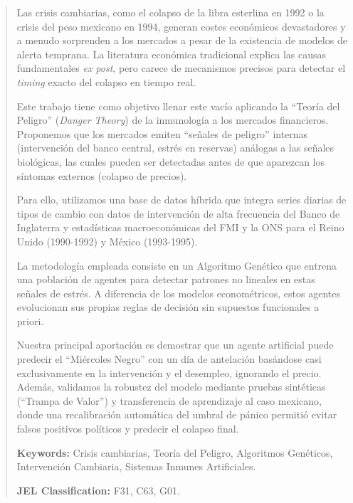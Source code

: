 \begin{abstract}
\noindent
\newline
Las crisis cambiarias, como el colapso de la libra esterlina en 1992 o la crisis del peso mexicano en 1994, generan costes económicos devastadores y a menudo sorprenden a los mercados a pesar de la existencia de modelos de alerta temprana. La literatura económica tradicional explica las causas fundamentales \textit{ex post}, pero carece de mecanismos precisos para detectar el \textit{timing} exacto del colapso en tiempo real.

Este trabajo tiene como objetivo llenar este vacío aplicando la ``Teoría del Peligro'' (\textit{Danger Theory}) de la inmunología a los mercados financieros. Proponemos que los mercados emiten ``señales de peligro'' internas (intervención del banco central, estrés en reservas) análogas a las señales biológicas, las cuales pueden ser detectadas antes de que aparezcan los síntomas externos (colapso de precios).

Para ello, utilizamos una base de datos híbrida que integra series diarias de tipos de cambio con datos de intervención de alta frecuencia del Banco de Inglaterra y estadísticas macroeconómicas del FMI y la ONS para el Reino Unido (1990-1992) y México (1993-1995).

La metodología empleada consiste en un Algoritmo Genético que entrena una población de agentes para detectar patrones no lineales en estas señales de estrés. A diferencia de los modelos econométricos, estos agentes evolucionan sus propias reglas de decisión sin supuestos funcionales a priori.

Nuestra principal aportación es demostrar que un agente artificial puede predecir el ``Miércoles Negro'' con un día de antelación basándose casi exclusivamente en la intervención y el desempleo, ignorando el precio. Además, validamos la robustez del modelo mediante pruebas sintéticas (``Trampa de Valor'') y transferencia de aprendizaje al caso mexicano, donde una recalibración automática del umbral de pánico permitió evitar falsos positivos políticos y predecir el colapso final.

\vspace{0.5cm}
\noindent \textbf{Keywords:} Crisis cambiarias, Teoría del Peligro, Algoritmos Genéticos, Intervención Cambiaria, Sistemas Inmunes Artificiales.

\noindent \textbf{JEL Classification:} F31, C63, G01.
\end{abstract}
